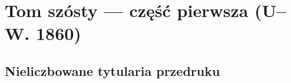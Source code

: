 \documentclass[12]{mwart}
\begin{document}


\section{Tom szósty --- część pierwsza (U--W. 1860)}
\label{sec:tom-szosty-cz}

\subsection{Nieliczbowane tytularia przedruku}
\label{sec:niel-tytul-przedr}
\newcommand{\pavia}[2]{http://teksty.klf.uw.edu.pl/20/22/LindeIIGP#1ocri.djvu?djvuopts=\&page=#2\&zoom=page}
\end{document}
